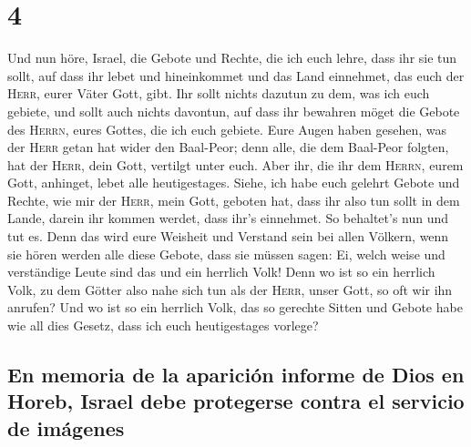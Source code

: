 \hypertarget{section-3}{%
\section{4}\label{section-3}}

 Und nun höre, Israel, die Gebote und Rechte, die ich euch
lehre, dass ihr sie tun sollt, auf dass ihr lebet und hineinkommet und
das Land einnehmet, das euch der \textsc{Herr}, eurer Väter Gott, gibt.
 Ihr sollt nichts dazutun zu dem, was ich euch gebiete,
und sollt auch nichts davontun, auf dass ihr bewahren möget die Gebote
des \textsc{Herrn}, eures Gottes, die ich euch gebiete. 
Eure Augen haben gesehen, was der \textsc{Herr} getan hat wider den
Baal-Peor; denn alle, die dem Baal-Peor folgten, hat der \textsc{Herr},
dein Gott, vertilgt unter euch.  Aber ihr, die ihr dem
\textsc{Herrn}, eurem Gott, anhinget, lebet alle heutigestages.
 Siehe, ich habe euch gelehrt Gebote und Rechte, wie mir
der \textsc{Herr}, mein Gott, geboten hat, dass ihr also tun sollt in
dem Lande, darein ihr kommen werdet, dass ihr's einnehmet.
 So behaltet's nun und tut es. Denn das wird eure Weisheit
und Verstand sein bei allen Völkern, wenn sie hören werden alle diese
Gebote, dass sie müssen sagen: Ei, welch weise und verständige Leute
sind das und ein herrlich Volk!  Denn wo ist so ein
herrlich Volk, zu dem Götter also nahe sich tun als der \textsc{Herr},
unser Gott, so oft wir ihn anrufen?  Und wo ist so ein
herrlich Volk, das so gerechte Sitten und Gebote habe wie all dies
Gesetz, dass ich euch heutigestages vorlege?

\hypertarget{en-memoria-de-la-apariciuxf3n-informe-de-dios-en-horeb-israel-debe-protegerse-contra-el-servicio-de-imuxe1genes}{%
\subsection{En memoria de la aparición informe de Dios en Horeb, Israel
debe protegerse contra el servicio de
imágenes}\label{en-memoria-de-la-apariciuxf3n-informe-de-dios-en-horeb-israel-debe-protegerse-contra-el-servicio-de-imuxe1genes}}

